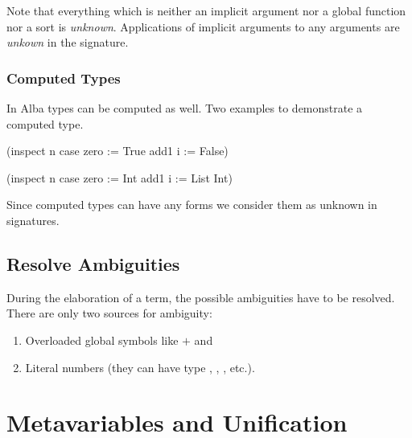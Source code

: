 Note that everything which is neither an implicit argument nor a global function
nor a sort is \emph{unknown}. Applications of implicit arguments to any
arguments are \emph{unkown} in the signature.





\subsubsection{Computed Types}

In Alba types can be computed as well. Two examples to demonstrate a computed
type.
%
\begin{alba}
    (inspect n case
        zero := True
        add1 i := False)

    (inspect n case
        zero := Int
        add1 i := List Int)
\end{alba}
%

Since computed types can have any forms we consider them as unknown in
signatures.










\subsection{Resolve Ambiguities}

During the elaboration of a term, the possible ambiguities have to be resolved.
There are only two sources for ambiguity:
%
\begin{enumerate}

\item Overloaded global symbols like $+$ and 

\item Literal numbers (they can have type , ,
, etc.).

\end{enumerate}








\section{Metavariables and Unification}


